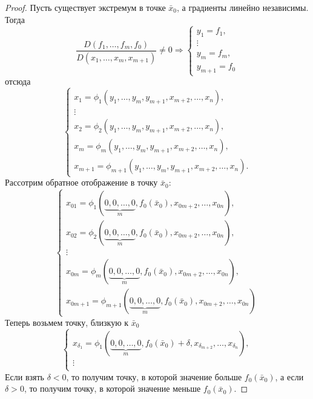\begin{proof}
    Пусть существует экстремум в точке $\bar{x}_0$, а градиенты линейно независимы. Тогда
    \[\frac{D(f_1,\dots,f_m,f_0)}{D(x_1,\dots,x_m,x_{m+1})}\ne 0 \Rightarrow
    \begin{cases}
        y_1=f_1,\\
        \vdots\\
        y_m=f_m,\\
        y_{m+1}=f_0
    \end{cases}    
    \]
    отсюда
    \[\begin{cases}
        x_1=\phi_1(y_1,\dots,y_m,y_{m+1},x_{m+2},\dots,x_n),\\
        \vdots\\
        x_2=\phi_2(y_1,\dots,y_m,y_{m+1},x_{m+2},\dots,x_n),\\
        x_m=\phi_m(y_1,\dots,y_m,y_{m+1},x_{m+2},\dots,x_n),\\
        x_{m+1}=\phi_{m+1}(y_1,\dots,y_m,y_{m+1},x_{m+2},\dots,x_n).
    \end{cases}\]
    Рассотрим обратное отображение в точку $\bar{x}_0$:
    \[\begin{cases}
        x_{01}=\phi_1(\underbrace{0,0,\dots,0}_m,f_0(\bar{x}_0), x_{0m+2}, \dots, x_{0n}),\\ %
        x_{02}=\phi_2(\underbrace{0,0,\dots,0}_m,f_0(\bar{x}_0), x_{0m+2}, \dots, x_{0n}),\\
        \vdots\\
        x_{0m}=\phi_{m}(\underbrace{0,0,\dots,0}_m,f_0(\bar{x}_0), x_{0m+2}, \dots, x_{0n}),\\
        x_{0m+1}=\phi_{m+1}(\underbrace{0,0,\dots,0}_m,f_0(\bar{x}_0), x_{0m+2}, \dots, x_{0n})
    \end{cases}
    \]
    Теперь возьмем точку, близкую к $\bar{x}_0$
    \[
    \begin{cases}
        x_{\delta_1}=\phi_1(\underbrace{0,0,\dots,0}_m,f_0(\bar{x}_0)+\delta,x_{\delta_{m+2}},\dots,x_{\delta_n}),\\
        \vdots\\

    \end{cases}
    \]
    Если взять $\delta<0$, то получим точку, в которой значение больше $f_0(\bar{x}_0)$, а если $\delta>0$, то получим точку, в которой значение меньше $f_0(\bar{x}_0)$.
\end{proof} 
